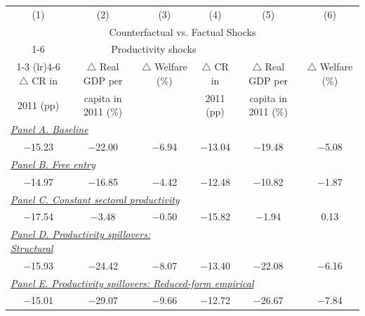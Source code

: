 \begin{tabular}{ccc ccc }
\toprule
(1) & (2) & (3) & (4) & (5) & (6) \\
\multicolumn{6}{c}{Counterfactual vs. Factual Shocks}\\
\cmidrule(lr){1-6}
\multicolumn{3}{c}{All shocks} & \multicolumn{3}{c}{Productivity shocks}\\
\cmidrule(lr){1-3} \cmidrule(lr){4-6}
$\triangle$ CR in & $\triangle$ Real GDP per & $\triangle$ Welfare (\%) & $\triangle$ CR in & $\triangle$ Real GDP per & $\triangle$ Welfare (\%) \\
2011 (pp) & capita in 2011 (\%) & & 2011 (pp) & capita in 2011 (\%) & \\
\midrule
\multicolumn{3}{l}{\underline{\textit{Panel A. Baseline}}} & & &\\
$-$15.23 & $-$22.00 & $-$6.94 & $-$13.04 & $-$19.48 & $-$5.08 \\
\multicolumn{3}{l}{\underline{\textit{Panel B. Free entry}}} & & &\\
$-$14.97 & $-$16.85 & $-$4.42 & $-$12.48 & $-$10.82 & $-$1.87 \\
\multicolumn{3}{l}{\underline{\textit{Panel C. Constant sectoral productivity}}} & & &\\
$-$17.54 & $-$3.48 & $-$0.50 & $-$15.82 & $-$1.94 & 0.13 \\
\multicolumn{3}{l}{\underline{\textit{Panel D. Productivity spillovers: Structural \citep{Choi_Shim:25}}}} & & &\\
$-$15.93 & $-$24.42 & $-$8.07 & $-$13.40 & $-$22.08 & $-$6.16 \\
\multicolumn{5}{l}{\underline{\textit{Panel E. Productivity spillovers: Reduced-form empirical}}} &\\
$-$15.01 & $-$29.07 & $-$9.66 & $-$12.72 & $-$26.67 & $-$7.84 \\
\bottomrule
\end{tabular}
